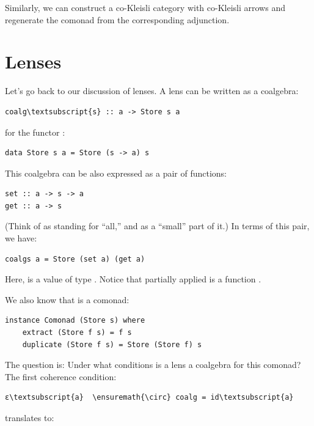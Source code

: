Similarly, we can construct a co-Kleisli category with co-Kleisli arrows
and regenerate the comonad from the corresponding adjunction.

\section{Lenses}\label{lenses}

Let's go back to our discussion of lenses. A lens can be written as a
coalgebra:

\begin{Verbatim}[commandchars=\\\{\}]
coalg\textsubscript{s} :: a -> Store s a
\end{Verbatim}
for the functor :

\begin{Verbatim}[commandchars=\\\{\}]
data Store s a = Store (s -> a) s
\end{Verbatim}
This coalgebra can be also expressed as a pair of functions:

\begin{Verbatim}[commandchars=\\\{\}]
set :: a -> s -> a
get :: a -> s
\end{Verbatim}
(Think of  as standing for ``all,'' and  as a
``small'' part of it.) In terms of this pair, we have:

\begin{Verbatim}[commandchars=\\\{\}]
coalgs a = Store (set a) (get a)
\end{Verbatim}
Here,  is a value of type . Notice that partially
applied  is a function .

We also know that  is a comonad:

\begin{Verbatim}[commandchars=\\\{\}]
instance Comonad (Store s) where
    extract (Store f s) = f s
    duplicate (Store f s) = Store (Store f) s
\end{Verbatim}
The question is: Under what conditions is a lens a coalgebra for this
comonad? The first coherence condition:

\begin{Verbatim}[commandchars=\\\{\}]
ε\textsubscript{a}  \ensuremath{\circ} coalg = id\textsubscript{a}
\end{Verbatim}
translates to:

